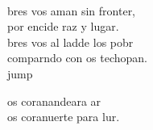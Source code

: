 \begin{cancion}
\begin{chorus}
	\end{chorus}%
	\jump\\
	bres vos aman sin fronter,\\
	por encide raz y lugar. \\
	bres vos al ladde los pobr\\
	comparndo con os techopan.\\jump\\
	\begin{chorus}%
	os coranandeara ar\\
	os coranuerte para lur.\\
	\end{chorus}%
	\jump\\
\end{cancion}%
